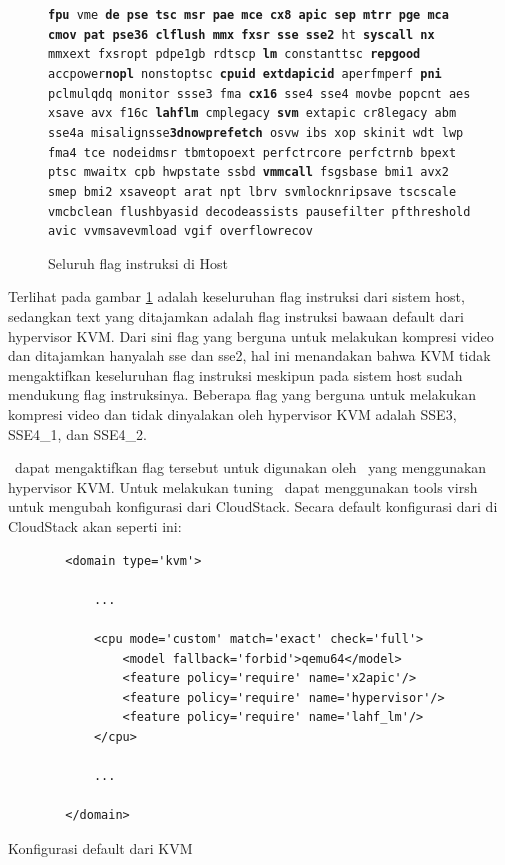 \begin{figure}
    \texttt{\textbf{fpu} vme \textbf{de pse tsc msr pae mce cx8 apic sep mtrr pge mca} \textbf{cmov pat pse36 clflush mmx fxsr sse sse2} ht \textbf{syscall nx} mmxext fxsr\textunderscore opt pdpe1gb rdtscp \textbf{lm} constant\textunderscore tsc \textbf{rep\textunderscore good} acc\textunderscore power\textbf{nopl} nonstop\textunderscore tsc \textbf{cpuid}  \textbf{extd\textunderscore apicid} aperfmperf \textbf{pni} pclmulqdq monitor ssse3 fma \textbf{cx16} sse4 sse4 movbe popcnt aes xsave avx f16c \textbf{lahf\textunderscore lm} cmp\textunderscore legacy \textbf{svm} extapic cr8\textunderscore legacy abm sse4a misalignsse\textbf{3dnowprefetch} osvw ibs xop skinit wdt lwp fma4 tce nodeid\textunderscore msr tbmtopoext perfctr\textunderscore core perfctr\textunderscore nb bpext ptsc mwaitx cpb hw\textunderscore pstate ssbd \textbf{vmmcall} fsgsbase bmi1 avx2 smep bmi2 xsaveopt arat npt lbrv svm\textunderscore locknrip\textunderscore save tsc\textunderscore scale vmcb\textunderscore clean flushbyasid decodeassists pausefilter pfthreshold avic v\textunderscore vmsave\textunderscore vmload vgif overflow\textunderscore recov}
    \caption{Seluruh flag instruksi di Host}
    \label{fig:flag_kvm_host}
\end{figure}

Terlihat pada gambar \ref{fig:flag_kvm_host} adalah keseluruhan flag instruksi dari sistem host, sedangkan text yang ditajamkan adalah flag instruksi bawaan default dari hypervisor KVM. Dari sini flag yang berguna untuk melakukan kompresi video dan ditajamkan hanyalah sse dan sse2, hal ini menandakan bahwa KVM tidak mengaktifkan keseluruhan flag instruksi meskipun pada sistem host sudah mendukung flag instruksinya. Beberapa flag yang berguna untuk melakukan kompresi video dan tidak dinyalakan oleh hypervisor KVM adalah SSE3, SSE4\_1, dan SSE4\_2. 

\saya\ dapat mengaktifkan flag tersebut untuk digunakan oleh \vm\ yang menggunakan hypervisor KVM. Untuk melakukan tuning \saya\ dapat menggunakan tools virsh untuk mengubah konfigurasi \vm dari CloudStack. Secara default konfigurasi dari \vm di CloudStack akan seperti ini:

\begin{listing}[H]
    \begin{verbatim}
        <domain type='kvm'>
        
            ...
            
            <cpu mode='custom' match='exact' check='full'>
                <model fallback='forbid'>qemu64</model>
                <feature policy='require' name='x2apic'/>
                <feature policy='require' name='hypervisor'/>
                <feature policy='require' name='lahf_lm'/>
            </cpu>
            
            ...
            
        </domain>
    \end{verbatim}
    \caption{Konfigurasi default dari KVM}
    \label{code:default_kvm_xml}
\end{listing}

